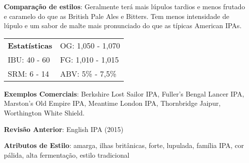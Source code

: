\textbf{Comparação de estilos}: Geralmente terá mais lúpulos tardios e menos frutado e caramelo do que as British Pale Ales e Bitters. Tem menos intensidade de lúpulo e um sabor de malte mais pronunciado do que as típicas American IPAs.

\begin{tabular}{@{}p{35mm}p{35mm}@{}}
  \textbf{Estatísticas} & OG: 1,050 - 1,070 \\
  IBU: 40 - 60  & FG: 1,010 - 1,015  \\
  SRM: 6 - 14  & ABV: 5\% - 7,5\%
\end{tabular}

\textbf{Exemplos Comerciais}: Berkshire Lost Sailor IPA, Fuller's Bengal Lancer IPA, Marston’s Old Empire IPA, Meantime London IPA, Thornbridge Jaipur, Worthington White Shield.

\textbf{Revisão Anterior}: English IPA (2015)

\textbf{Atributos de Estilo}: amarga, ilhas britânicas, forte, lupulada, família IPA, cor pálida, alta fermentação, estilo tradicional
